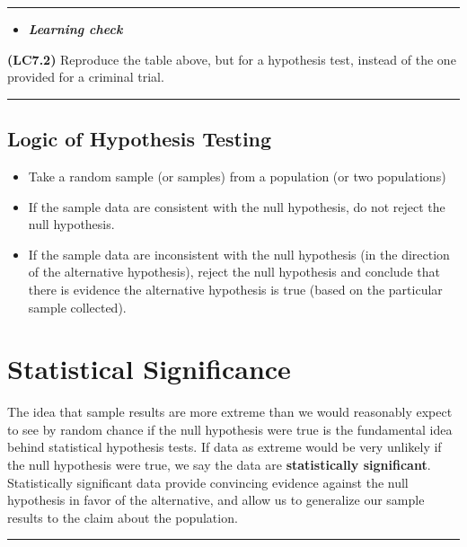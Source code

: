 \documentclass[]{tufte-book}
\let\oldrule=\rule
\renewcommand{\rule}[1]{\oldrule{\linewidth}}
\providecommand{\tightlist}{%
  \setlength{\itemsep}{0pt}\setlength{\parskip}{0pt}}
\newenvironment{rmdblock}[1]
  {\begin{shaded*}
  \begin{itemize}
  \renewcommand{\labelitemi}{
    \raisebox{-.7\height}[0pt][0pt]{
    }
  }
  \item
  }
  {
  \end{itemize}
  \end{shaded*}
  }
\newenvironment{learncheck}
  {\begin{rmdblock}{warning}}
  {\end{rmdblock}}
\begin{document}
\begin{center}\rule{0.5\linewidth}{\linethickness}\end{center}

\begin{learncheck}
\textbf{\emph{Learning check}}
\end{learncheck}

\textbf{(LC7.2)} Reproduce the table above, but for a hypothesis test,
instead of the one provided for a criminal trial.

\begin{center}\rule{0.5\linewidth}{\linethickness}\end{center}

\subsection{Logic of Hypothesis
Testing}\label{logic-of-hypothesis-testing}

\begin{itemize}
\tightlist
\item
  Take a random sample (or samples) from a population (or two
  populations)
\item
  If the sample data are consistent with the null hypothesis, do not
  reject the null hypothesis.
\item
  If the sample data are inconsistent with the null hypothesis (in the
  direction of the alternative hypothesis), reject the null hypothesis
  and conclude that there is evidence the alternative hypothesis is true
  (based on the particular sample collected).
\end{itemize}

\section{Statistical Significance}\label{statistical-significance}

The idea that sample results are more extreme than we would reasonably
expect to see by random chance if the null hypothesis were true is the
fundamental idea behind statistical hypothesis tests. If data as extreme
would be very unlikely if the null hypothesis were true, we say the data
are \textbf{statistically significant}. Statistically significant data
provide convincing evidence against the null hypothesis in favor of the
alternative, and allow us to generalize our sample results to the claim
about the population.

\begin{center}\rule{0.5\linewidth}{\linethickness}\end{center}
\end{document}

